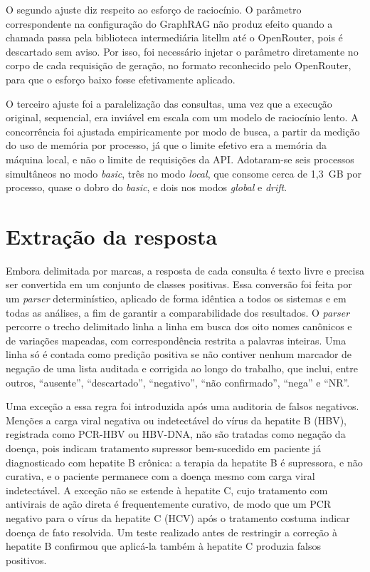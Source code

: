 O segundo ajuste diz respeito ao esforço de raciocínio. O parâmetro correspondente na configuração do GraphRAG não produz efeito quando a chamada passa pela biblioteca intermediária litellm até o OpenRouter, pois é descartado sem aviso. Por isso, foi necessário injetar o parâmetro diretamente no corpo de cada requisição de geração, no formato reconhecido pelo OpenRouter, para que o esforço baixo fosse efetivamente aplicado.

O terceiro ajuste foi a paralelização das consultas, uma vez que a execução original, sequencial, era inviável em escala com um modelo de raciocínio lento. A concorrência foi ajustada empiricamente por modo de busca, a partir da medição do uso de memória por processo, já que o limite efetivo era a memória da máquina local, e não o limite de requisições da API. Adotaram-se seis processos simultâneos no modo \textit{basic}, três no modo \textit{local}, que consome cerca de 1,3~GB por processo, quase o dobro do \textit{basic}, e dois nos modos \textit{global} e \textit{drift}.

\section{Extração da resposta}\label{sec:met-parser}

Embora delimitada por marcas, a resposta de cada consulta é texto livre e precisa ser convertida em um conjunto de classes positivas. Essa conversão foi feita por um \textit{parser} determinístico, aplicado de forma idêntica a todos os sistemas e em todas as análises, a fim de garantir a comparabilidade dos resultados. O \textit{parser} percorre o trecho delimitado linha a linha em busca dos oito nomes canônicos e de variações mapeadas, com correspondência restrita a palavras inteiras. Uma linha só é contada como predição positiva se não contiver nenhum marcador de negação de uma lista auditada e corrigida ao longo do trabalho, que inclui, entre outros, ``ausente'', ``descartado'', ``negativo'', ``não confirmado'', ``nega'' e ``NR''.

Uma exceção a essa regra foi introduzida após uma auditoria de falsos negativos. Menções a carga viral negativa ou indetectável do vírus da hepatite B (HBV), registrada como PCR-HBV ou HBV-DNA, não são tratadas como negação da doença, pois indicam tratamento supressor bem-sucedido em paciente já diagnosticado com hepatite B crônica: a terapia da hepatite B é supressora, e não curativa, e o paciente permanece com a doença mesmo com carga viral indetectável. A exceção não se estende à hepatite C, cujo tratamento com antivirais de ação direta é frequentemente curativo, de modo que um PCR negativo para o vírus da hepatite C (HCV) após o tratamento costuma indicar doença de fato resolvida. Um teste realizado antes de restringir a correção à hepatite B confirmou que aplicá-la também à hepatite C produzia falsos positivos.

